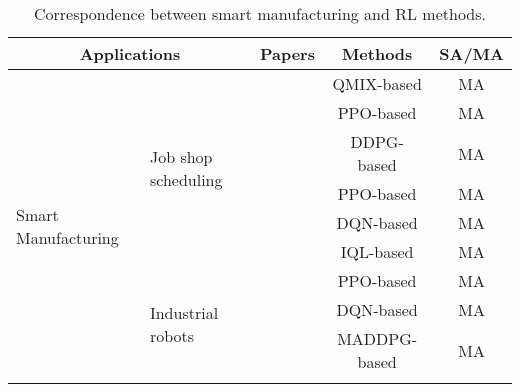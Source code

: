 \documentclass[acmsmall]{acmart}
\begin{document}
\begin{table}[]
\centering
\caption{Correspondence between smart manufacturing and RL methods.}
\label{manufacturing}
\begin{tabularx}{\textwidth}{|XX|c|c|c|}
\hline
\multicolumn{2}{|c|}{Applications}                                                                    & Papers                                          & Methods                    & SA/MA \\ \hline
\multicolumn{1}{|X|}{\multirow{12}{=}{\centering Smart Manufacturing}} & \multirow{6}{=}{\centering Job shop scheduling}    & \cite{WANG2022102324}                           & QMIX-based \cite{qmix}     & MA       \\ \cline{3-5} 
\multicolumn{1}{|X|}{}                                      &                                         & \cite{ZHANG2022102412}                           & PPO-based \cite{ppo}       & MA       \\ \cline{3-5} 
\multicolumn{1}{|X|}{}                                      &                                         & \cite{Jing2022}                                 & DDPG-based \cite{ddpg}     & MA       \\ \cline{3-5} 
\multicolumn{1}{|X|}{}                                      &                                         & \cite{POPPER202263,9590925}                     & PPO-based \cite{ppo}       & MA       \\ \cline{3-5} 
\multicolumn{1}{|X|}{}                                      &                                         & \cite{ZHANG2023110083}                          & DQN-based   \cite{dqn}     & MA       \\ \cline{3-5} 
\multicolumn{1}{|X|}{}                                      &                                         & \cite{10.1007/978-3-030-41913-4_1}              & IQL-based \cite{iql}       & MA       \\ \cline{2-5} 
\multicolumn{1}{|X|}{}                                      & \multirow{4}{=}{\centering Industrial robots}      & \cite{agrawal_won_sharma_deshpande_mccomb_2021} & PPO-based \cite{ppo}       & MA       \\ \cline{3-5} 
\multicolumn{1}{|X|}{}                                      &                                         & \cite{Tan2019}                                  & DQN-based   \cite{dqn}     & MA       \\ \cline{3-5} 
\multicolumn{1}{|X|}{}                                      &                                         & \cite{krnjaic2022scalable}                      & MADDPG-based \cite{maddpg} & MA       \\ \cline{3-5} 

\end{tabularx}
\end{table}
\end{document}

